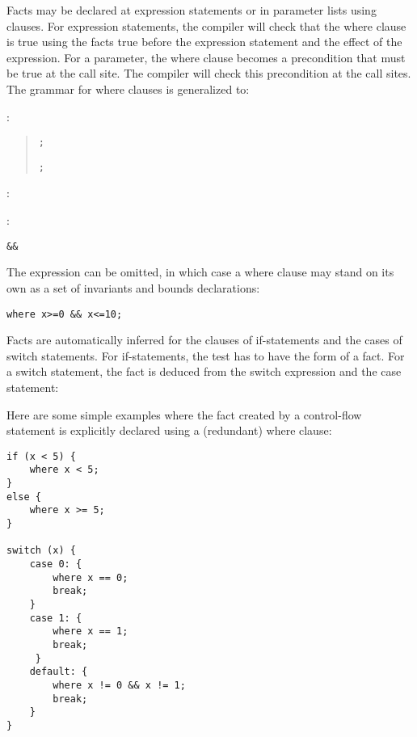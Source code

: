Facts may be declared at expression statements or in parameter lists
using  clauses. For expression statements, the compiler
will check that the where clause is true using the facts true before the
expression statement and the effect of the expression. For a parameter,
the where clause becomes a precondition that must be true at the call
site. The compiler will check this precondition at the call sites. The
grammar for where clauses is generalized to:

:

\begin{quote}
\texttt{;}

\texttt{;}
\end{quote}

:

\begin{quote}
 
\end{quote}

:

\begin{quote}
\end{quote}

 \texttt{\&\&} 

The expression can be omitted, in which case a where clause may stand on
its own as a set of invariants and bounds declarations:
\begin{verbatim}
where x>=0 && x<=10;
\end{verbatim}

Facts are automatically inferred for the clauses of if-statements and
the cases of switch statements. For if-statements, the test has to have
the form of a fact. For a switch statement, the fact is deduced from the
switch expression and the case statement:

Here are some simple examples where the fact created by a control-flow
statement is explicitly declared using a (redundant) where clause:

\begin{verbatim}
if (x < 5) {
    where x < 5;
}
else {
    where x >= 5;
} 

switch (x) {
    case 0: {
        where x == 0;
        break;
    }
    case 1: {
        where x == 1;
        break;
     }   
    default: {
        where x != 0 && x != 1;
        break;
    }
}
\end{verbatim}

